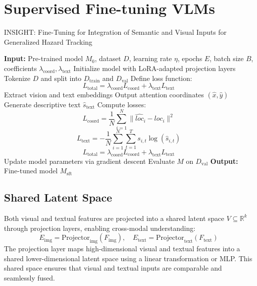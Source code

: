 \section{Supervised Fine-tuning VLMs}
\begin{algorithm}[!t]
\caption{INSIGHT: Fine-Tuning for Integration of Semantic and Visual Inputs for Generalized Hazard Tracking}
\label{alg:hazard_localization}
\begin{algorithmic}[1]
\State \textbf{Input:} Pre-trained model $M_0$, dataset $D$, learning rate $\eta$, epochs $E$, batch size $B$, coefficients $\lambda_{\text{coord}}, \lambda_{\text{text}}$
\State Initialize model with LoRA-adapted projection layers
\State Tokenize $D$ and split into $D_{\text{train}}$ and $D_{\text{val}}$
\State Define loss function:
\[
L_{\text{total}} = \lambda_{\text{coord}} L_{\text{coord}} + \lambda_{\text{text}} L_{\text{text}} \label{loss_total}
\]
        \State Extract vision and text embeddings
        \State Output attention coordinates $(\hat{x}, \hat{y})$
        \State Generate descriptive text $\hat{s}_{\text{text}}$
        \State Compute losses:
        \[L_{\text{coord}} = \frac{1}{N} \sum_{i=1}^{N} \| \hat{loc}_i - loc_i \|^2\] \label{loss1}
        \[L_{\text{text}} = -\frac{1}{N} \sum_{i=1}^{N} \sum_{t=1}^{T} s_{i,t} \log(\hat{s}_{i,t})\] \label{loss2}
        \[L_{\text{total}} = \lambda_{\text{coord}} L_{\text{coord}} + \lambda_{\text{text}} L_{\text{text}}\] \label{loss3}
        \State Update model parameters via gradient descent
    \EndFor
    \State Evaluate $M$ on $D_{\text{val}}$
\EndFor
\State \textbf{Output:} Fine-tuned model $M_{\text{sft}}$
\end{algorithmic}
\end{algorithm}


\subsection{Shared Latent Space}
Both visual and textual features are projected into a shared latent space $V \subseteq \mathbb{R}^k$ through projection layers, enabling cross-modal understanding:
\begin{equation}
    E_{\text{img}} = \text{Projector}_{\text{img}}(F_{\text{img}}),\quad E_{\text{text}} = \text{Projector}_{\text{text}}(F_{\text{text}})
\end{equation}
% 
The projection layer maps high-dimensional visual and textual features into a shared lower-dimensional latent space using a linear transformation or MLP. This shared space ensures that visual and textual inputs are comparable and seamlessly fused.

